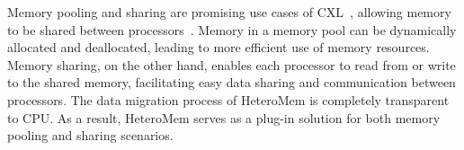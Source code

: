 Memory pooling and sharing are promising use cases of CXL~\cite{ha2023dynamic}, allowing memory to be shared between processors~\cite{cxl_pooling_sharing}. 
Memory in a memory pool can be dynamically allocated and deallocated, leading to more efficient use of memory resources. 
Memory sharing, on the other hand, enables each processor to read from or write to the shared memory, facilitating easy data sharing and communication between processors.
The data migration process of HeteroMem is completely transparent to CPU.
As a result, HeteroMem serves as a plug-in solution for both memory pooling and sharing scenarios.

